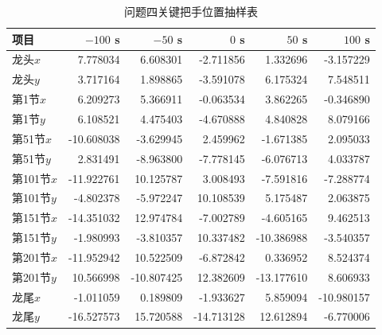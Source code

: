 \begin{table}[H]
\centering
\caption{问题四关键把手位置抽样表}
\label{tab:q4-position-extract}
\begingroup
\setlength{\tabcolsep}{3pt}
\begin{tabularx}{\textwidth}{>{\raggedright\arraybackslash}p{}*{5}{R}}
\toprule
项目 & $-100$ s & $-50$ s & $0$ s & $50$ s & $100$ s\\
\midrule
龙头$x$ & 7.778034 & 6.608301 & -2.711856 & 1.332696 & -3.157229\\
龙头$y$ & 3.717164 & 1.898865 & -3.591078 & 6.175324 & 7.548511\\
第1节$x$ & 6.209273 & 5.366911 & -0.063534 & 3.862265 & -0.346890\\
第1节$y$ & 6.108521 & 4.475403 & -4.670888 & 4.840828 & 8.079166\\
第51节$x$ & -10.608038 & -3.629945 & 2.459962 & -1.671385 & 2.095033\\
第51节$y$ & 2.831491 & -8.963800 & -7.778145 & -6.076713 & 4.033787\\
第101节$x$ & -11.922761 & 10.125787 & 3.008493 & -7.591816 & -7.288774\\
第101节$y$ & -4.802378 & -5.972247 & 10.108539 & 5.175487 & 2.063875\\
第151节$x$ & -14.351032 & 12.974784 & -7.002789 & -4.605165 & 9.462513\\
第151节$y$ & -1.980993 & -3.810357 & 10.337482 & -10.386988 & -3.540357\\
第201节$x$ & -11.952942 & 10.522509 & -6.872842 & 0.336952 & 8.524374\\
第201节$y$ & 10.566998 & -10.807425 & 12.382609 & -13.177610 & 8.606933\\
龙尾$x$ & -1.011059 & 0.189809 & -1.933627 & 5.859094 & -10.980157\\
龙尾$y$ & -16.527573 & 15.720588 & -14.713128 & 12.612894 & -6.770006\\
\bottomrule
\end{tabularx}
\endgroup
\end{table}

